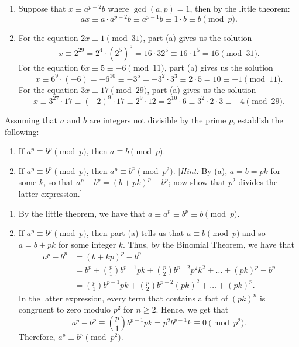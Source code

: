 \begin{solution}
    \begin{enumerate}
        \item Suppose that $x \equiv a^{p-2}b$ where $\gcd(a, p) = 1$, then by the little theorem:
        $$ax \equiv a \cdot a^{p-2}b \equiv a^{p-1}b \equiv 1 \cdot b \equiv b \pmod p.$$
        \item For the equation $2x \equiv 1 \pmod{31}$, part (a) gives us the solution
        $$x \equiv 2^{29} = 2^4 \cdot (2^{5})^5 = 16 \cdot 32^5 \equiv 16 \cdot 1^5 = 16 \pmod{31}.$$
        For the equation $6x \equiv 5 \equiv -6 \pmod{11}$, part (a) gives us the solution
        $$x \equiv 6^9\cdot (-6) = -6^{10} \equiv - 3^5 = -3^2 \cdot 3^3 \equiv 2 \cdot 5 = 10 \equiv -1\pmod{11}.$$
        For the equation $3x \equiv 17\pmod{29}$, part (a) gives us the solution
        $$x \equiv 3^{27}\cdot 17 \equiv (-2)^9 \cdot 17 \equiv 2^9 \cdot 12 = 2^{10} \cdot 6 \equiv 3^2 \cdot 2 \cdot 3 \equiv -4 \pmod{29}.$$
    \end{enumerate}
\end{solution}

\begin{exercise}
    Assuming that $a$ and $b$ are integers not divisible by the prime $p$, establish the following:
    \begin{enumerate}
        \item If $a^p \equiv b^p \pmod p$, then $a \equiv b \pmod p$.
        \item If $a^p \equiv b^p \pmod p$, then $a^p \equiv b^p \pmod{p^2}$. [\textit{Hint:} By (a), $a = b = pk$ for some $k$, so that $a^p - b^p = (b+pk)^p - b^p$; now show that $p^2$ divides the latter expression.]
    \end{enumerate}
\end{exercise}

\begin{solution}
    \begin{enumerate}
        \item By the little theorem, we have that $a \equiv a^p \equiv b^p \equiv b \pmod p$.
        \item If $a^p \equiv b^p \pmod p$, then part (a) tells us that $a \equiv b \pmod p$ and so $a = b + pk$ for some integer $k$. Thus, by the Binomial Theorem, we have that
        \begin{align*}
            a^p - b^p &= (b + kp)^p - b^p \\
            &= b^p + \binom{p}{1}b^{p-1}pk + \binom{p}{2}b^{p-2}p^2k^2 + \dots + (pk)^p - b^p \\
            &= \binom{p}{1}b^{p-1}pk + \binom{p}{2}b^{p-2}(pk)^2 + \dots + (pk)^p.
        \end{align*}
        In the latter expression, every term that contains a fact of $(pk)^n$ is congruent to zero modulo $p^2$ for $n \geq 2$. Hence, we get that 
        $$a^p - b^p \equiv \binom{p}{1}b^{p-1}pk = p^2 b^{p-1}k \equiv 0 \pmod{p^2}.$$
        Therefore, $a^p \equiv b^p \pmod{p^2}$. \\
    \end{enumerate}
\end{solution}

